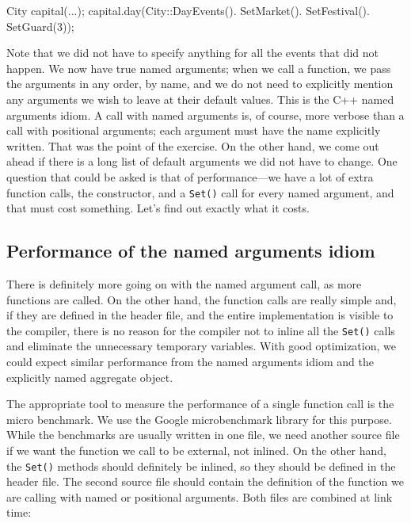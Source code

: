 \begin{code}
City capital(...);
capital.day(City::DayEvents().
            SetMarket().
            SetFestival().
            SetGuard(3));
\end{code}

Note that we did not have to specify anything for all the events that did not happen. We now have true named arguments; when we call a function, we pass the arguments in any order, by name, and we do not need to explicitly mention any arguments we wish to leave at their default values. This is the C++ named arguments idiom. A call with named arguments is, of course, more verbose than a call with positional arguments; each argument must have the name explicitly written. That was the point of the exercise. On the other hand, we come out ahead if there is a long list of default arguments we did not have to change. One question that could be asked is that of performance---we have a lot of extra function calls, the constructor, and a \texttt{Set()} call for every named argument, and that must cost something. Let's find out exactly what it costs.

\subsection{Performance of the named arguments idiom}

There is definitely more going on with the named argument call, as more functions are called. On the other hand, the function calls are really simple and, if they are defined in the header file, and the entire implementation is visible to the compiler, there is no reason for the compiler not to inline all the \texttt{Set()} calls and eliminate the unnecessary temporary variables. With good optimization, we could expect similar performance from the named arguments idiom and the explicitly named aggregate object.

The appropriate tool to measure the performance of a single function call is the micro benchmark. We use the Google microbenchmark library for this purpose. While the benchmarks are usually written in one file, we need another source file if we want the function we call to be external, not inlined. On the other hand, the \texttt{Set()} methods should definitely be inlined, so they should be defined in the header file. The second source file should contain the definition of the function we are calling with named or positional arguments. Both files are combined at link time:

